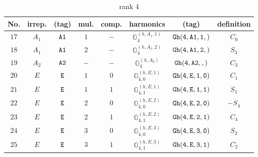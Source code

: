 \documentclass[fleqn,8pt]{jsarticle}
\begin{document}
\begin{table}[ht!]
\begin{center}
\caption{rank 4}
\renewcommand{\arraystretch}{1.3}
\begin{tabular}{cccccccc} \hline \hline
No. & irrep. & (tag) & mul. & comp. & harmonics & (tag) & definition \\ \hline
$ 17 $ & $ A_{1} $ & $ {\tt A1} $ & $ 1 $ & $ - $ & $ \mathbb{G}_{4}^{(h,A_{1},1)} $ & $ {\tt Gh(4,A1,1,)} $ & $ C_{0} $ \\
$ 18 $ & $ A_{1} $ & $ {\tt A1} $ & $ 2 $ & $ - $ & $ \mathbb{G}_{4}^{(h,A_{1},2)} $ & $ {\tt Gh(4,A1,2,)} $ & $ S_{3} $ \\
$ 19 $ & $ A_{2} $ & $ {\tt A2} $ & $ - $ & $ - $ & $ \mathbb{G}_{4}^{(h,A_{2})} $ & $ {\tt Gh(4,A2,,)} $ & $ C_{3} $ \\
$ 20 $ & $ E $ & $ {\tt E} $ & $ 1 $ & $ 0 $ & $ \mathbb{G}_{4,0}^{(h,E,1)} $ & $ {\tt Gh(4,E,1,0)} $ & $ C_{1} $ \\
$ 21 $ & $ E $ & $ {\tt E} $ & $ 1 $ & $ 1 $ & $ \mathbb{G}_{4,1}^{(h,E,1)} $ & $ {\tt Gh(4,E,1,1)} $ & $ S_{1} $ \\
$ 22 $ & $ E $ & $ {\tt E} $ & $ 2 $ & $ 0 $ & $ \mathbb{G}_{4,0}^{(h,E,2)} $ & $ {\tt Gh(4,E,2,0)} $ & $ - S_{4} $ \\
$ 23 $ & $ E $ & $ {\tt E} $ & $ 2 $ & $ 1 $ & $ \mathbb{G}_{4,1}^{(h,E,2)} $ & $ {\tt Gh(4,E,2,1)} $ & $ C_{4} $ \\
$ 24 $ & $ E $ & $ {\tt E} $ & $ 3 $ & $ 0 $ & $ \mathbb{G}_{4,0}^{(h,E,3)} $ & $ {\tt Gh(4,E,3,0)} $ & $ S_{2} $ \\
$ 25 $ & $ E $ & $ {\tt E} $ & $ 3 $ & $ 1 $ & $ \mathbb{G}_{4,1}^{(h,E,3)} $ & $ {\tt Gh(4,E,3,1)} $ & $ C_{2} $ \\
 \hline \hline
\end{tabular}
\end{center}
\end{table}
\end{document}
